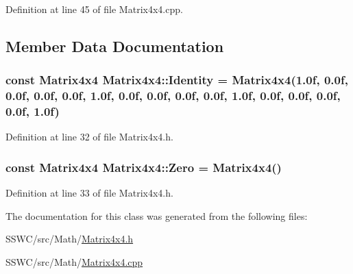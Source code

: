 Definition at line 45 of file Matrix4x4.\+cpp.



\subsection{Member Data Documentation}
\hypertarget{class_matrix4x4_acd4066dd53c9d97a6675f5f63736387b}{
\subsubsection[{Identity}]{\setlength{\rightskip}{0pt plus 5cm}const {\bf Matrix4x4} Matrix4x4\+::\+Identity = {\bf Matrix4x4}(1.\+0f, 0.\+0f, 0.\+0f, 0.\+0f, 0.\+0f, 1.\+0f, 0.\+0f, 0.\+0f, 0.\+0f, 0.\+0f, 1.\+0f, 0.\+0f, 0.\+0f, 0.\+0f, 0.\+0f, 1.\+0f)\hspace{0.3cm}{\ttfamily [static]}}}\label{class_matrix4x4_acd4066dd53c9d97a6675f5f63736387b}


Definition at line 32 of file Matrix4x4.\+h.

\hypertarget{class_matrix4x4_aa29a050d95415f55095e0a95cdca03c7}{
\subsubsection[{Zero}]{\setlength{\rightskip}{0pt plus 5cm}const {\bf Matrix4x4} Matrix4x4\+::\+Zero = {\bf Matrix4x4}()\hspace{0.3cm}{\ttfamily [static]}}}\label{class_matrix4x4_aa29a050d95415f55095e0a95cdca03c7}


Definition at line 33 of file Matrix4x4.\+h.



The documentation for this class was generated from the following files\+:\begin{DoxyCompactItemize}
\item 
S\+S\+W\+C/src/\+Math/\hyperlink{_matrix4x4_8h}{Matrix4x4.\+h}\item 
S\+S\+W\+C/src/\+Math/\hyperlink{_matrix4x4_8cpp}{Matrix4x4.\+cpp}\end{DoxyCompactItemize}
